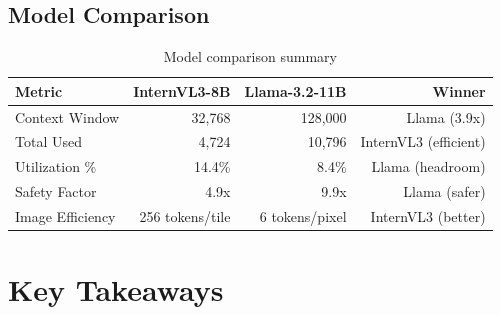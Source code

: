 \documentclass[11pt,a4paper]{article}
\begin{document}
\subsection{Model Comparison}

\begin{table}[h]
\centering
\begin{tabular}{lrrr}
\toprule
\textbf{Metric} & \textbf{InternVL3-8B} & \textbf{Llama-3.2-11B} & \textbf{Winner} \\
\midrule
Context Window & 32,768 & 128,000 & Llama (3.9x) \\
Total Used & 4,724 & 10,796 & InternVL3 (efficient) \\
Utilization \% & 14.4\% & 8.4\% & Llama (headroom) \\
Safety Factor & 4.9x & 9.9x & Llama (safer) \\
Image Efficiency & 256 tokens/tile & ~6 tokens/pixel & InternVL3 (better) \\
\bottomrule
\end{tabular}
\caption{Model comparison summary}
\end{table}

\section{Key Takeaways}
\end{document}
